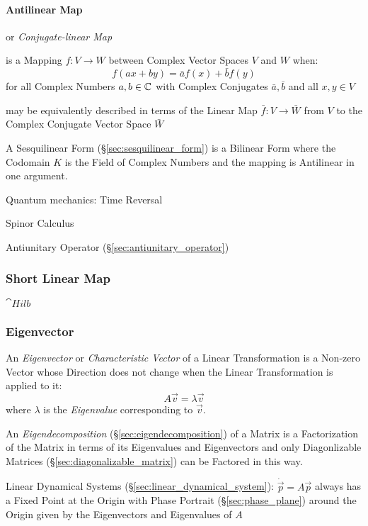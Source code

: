 \paragraph{Antilinear Map}\label{sec:antilinear_map}\hfill

or \emph{Conjugate-linear Map}

is a Mapping $f : V \rightarrow W$ between Complex Vector Spaces $V$ and $W$
when:
\[
  f (ax+by) = \bar{a}f(x) + \bar{b}f(y)
\]
for all Complex Numbers $a,b \in \mathbb{C}$ with Complex Conjugates $\bar{a},
\bar{b}$ and all $x,y \in V$

may be equivalently described in terms of the Linear Map $\bar{f} : V
\rightarrow \bar{W}$ from $V$ to the Complex Conjugate Vector Space $\bar{W}$

A Sesquilinear Form (\S\ref{sec:sesquilinear_form}) is a Bilinear Form where
the Codomain $K$ is the Field of Complex Numbers and the mapping is Antilinear
in one argument.


Quantum mechanics: Time Reversal

Spinor Calculus

\fist Antiunitary Operator (\S\ref{sec:antiunitary_operator})



\subsubsection{Short Linear Map}\label{sec:short_linear}

$\cat{Hilb}$



\subsubsection{Eigenvector}\label{sec:eigenvector}

An \emph{Eigenvector} or \emph{Characteristic Vector} of a Linear
Transformation is a Non-zero Vector whose Direction does not change when the
Linear Transformation is applied to it:
\[
  A\vec{v} = \lambda\vec{v}
\]
where $\lambda$ is the \emph{Eigenvalue} corresponding to $\vec{v}$.

An \emph{Eigendecomposition} (\S\ref{sec:eigendecomposition}) of a Matrix is a
Factorization of the Matrix in terms of its Eigenvalues and Eigenvectors and
only Diagonlizable Matrices (\S\ref{sec:diagonalizable_matrix}) can be Factored
in this way.

\fist Linear Dynamical Systems (\S\ref{sec:linear_dynamical_system}):
$\dot{\vec{p}} = A\vec{p}$ always has a Fixed Point at the Origin with Phase
Portrait (\S\ref{sec:phase_plane}) around the Origin given by the Eigenvectors
and Eigenvalues of $A$



